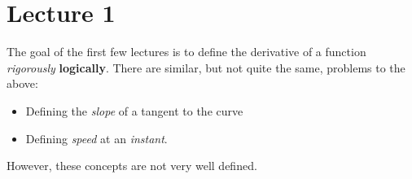 \section{Lecture 1}

\begin{idea}
    The goal of the first few lectures is to define the derivative of a function \textit{rigorously} \textbf{logically}. There are similar, but not quite the same, problems to the above:
    \begin{itemize}
        \item Defining the \emph{slope} of a tangent to the curve
        \item Defining \emph{speed} at an \textit{instant}.
    \end{itemize}
    However, these concepts are not very well defined.
\end{idea}
